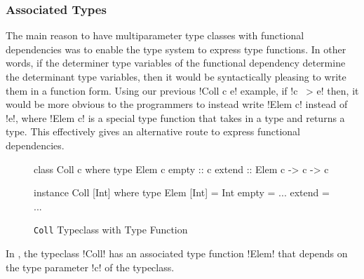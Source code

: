 \documentclass[manuscript,screen,nonacm]{acmart}
\begin{document}
\subsubsection{Associated Types}
The main reason to have multiparameter type classes with functional dependencies was to enable the type system to express type functions. In other words, if the determiner type variables of the functional dependency determine the determinant type variables, then it would be syntactically pleasing to write them in a function form.
Using our previous !Coll c e! example, if !c ~> e! then, it would be more obvious to the programmers to instead write !Elem c! instead of !e!, where !Elem c! is a special type function that takes in a type and returns a type. This effectively gives an alternative route to express functional dependencies.
\begin{figure}[ht]
  \begin{center}
    \begin{minipage}[ht]{0.4\linewidth}
      \begin{code}
        class Coll c where
           type Elem c
           empty :: c
           extend :: Elem c -> c -> c
      \end{code}
    \end{minipage}%
    \begin{minipage}[ht]{0.4\linewidth}
      \begin{code}
        instance Coll [Int] where
           type Elem [Int] = Int
           empty = ...
           extend = ...
      \end{code}
    \end{minipage}
  \end{center}
  \caption[Coll typeclass]{\lstinline{Coll} Typeclass with Type Function}
  \label{fig:type-fam}
\end{figure}

In , the typeclass !Coll! has an associated type function !Elem! that depends on the type parameter !c! of the typeclass.
\end{document}
